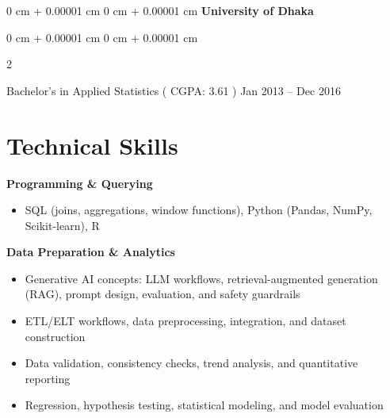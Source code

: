 \documentclass[10pt, letterpaper]{article}
\newenvironment{highlights}{
    \begin{itemize}[
        topsep=0.10 cm,
        parsep=0.10 cm,
        partopsep=0pt,
        itemsep=0pt,
        leftmargin=0 cm + 10pt
    ]
}{
    \end{itemize}
} %
\newenvironment{onecolentry}{
    \begin{adjustwidth}{
        0 cm + 0.00001 cm
    }{
        0 cm + 0.00001 cm
    }
}{
    \end{adjustwidth}
} %
\newenvironment{twocolentry}[2][]{
    \onecolentry
    \def\secondColumn{#2}
    \setcolumnwidth{\fill, 4.5 cm}
    \begin{paracol}{2}
}{
    \switchcolumn \raggedleft \secondColumn
    \end{paracol}
    \endonecolentry
} %
\begin{document}
            \vspace{0.20 cm}
     \begin{onecolentry}{
    \textbf{University of Dhaka}
    }
    \end{onecolentry}        
    \begin{twocolentry}{
            Jan 2013 – Dec 2016
        }
            Bachelor's in Applied Statistics ( CGPA: 3.61 )\end{twocolentry}
        \vspace{0.10 cm}


\section*{Technical Skills}

\textbf{Programming \& Querying}
\begin{itemize}
    \item SQL (joins, aggregations, window functions), Python (Pandas, NumPy, Scikit-learn), R
\end{itemize}

\textbf{Data Preparation \& Analytics}
\begin{itemize}
    \item Generative AI concepts: LLM workflows, retrieval-augmented generation (RAG), prompt design, evaluation, and safety guardrails
    \item ETL/ELT workflows, data preprocessing, integration, and dataset construction
    \item Data validation, consistency checks, trend analysis, and quantitative reporting
    \item Regression, hypothesis testing, statistical modeling, and model evaluation
\end{itemize}
\end{document}
